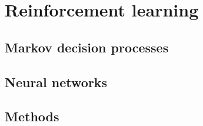 \chapter{Reinforcement learning}
\label{chap:rl}

\section{Markov decision processes}
\section{Neural networks}
\section{Methods}
